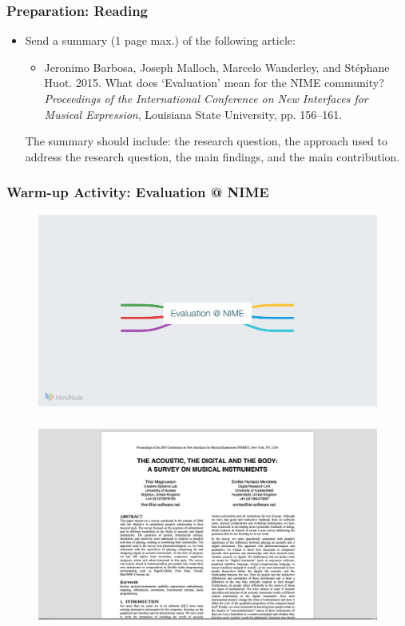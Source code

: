 \documentclass[screen, aspectratio=169]{beamer}
\begin{document}
\begin{frame}
\frametitle{Preparation: Reading}
\begin{itemize}
\item Send a summary (1 page max.) of the following article:
\begin{itemize}
\item Jeronimo Barbosa, Joseph Malloch, Marcelo Wanderley, and St\'{e}phane Huot. 2015. What does `Evaluation' mean for the NIME community? \emph{Proceedings of the International Conference on New Interfaces for Musical Expression}, Louisiana State University, pp. 156--161. \cite{Barbosa.et.al.2015.evaluationNIME}\\
\end{itemize}
The summary should include: the research question, the approach used to address the research question, the main findings, and the main contribution.
\end{itemize}
\end{frame}
%
\begin{frame}
\frametitle{Warm-up Activity: Evaluation @ NIME}
 \begin{figure}
	\includegraphics[scale=0.35]{img/mindmap-eval-nime.png}
    \end{figure}	
\end{frame}
%
\begin{frame}
\frametitle{}
\begin{figure}
	\includegraphics[scale=0.31]{img/Magnusson-Mendieta-2007.png}\\
	    \cite{Magnusson.Mendieta.2007.NIME}\\
    \end{figure}		
\end{frame}
\end{document}

